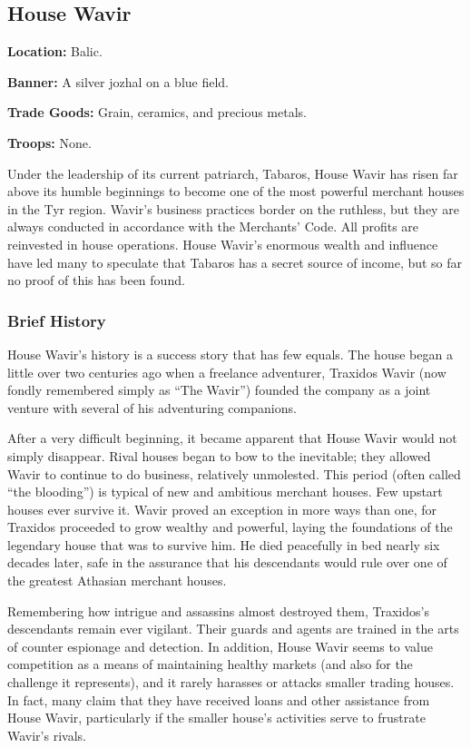 \subsection{House Wavir}
\textbf{Location:} Balic.

\textbf{Banner:} A silver jozhal on a blue field.

\textbf{Trade Goods:} Grain, ceramics, and precious metals.

\textbf{Troops:} None.

Under the leadership of its current patriarch, Tabaros, House Wavir has risen far above its humble beginnings to become one of the most powerful merchant houses in the Tyr region. Wavir's business practices border on the ruthless, but they are always conducted in accordance with the Merchants' Code. All profits are reinvested in house operations. House Wavir's enormous wealth and influence have led many to speculate that Tabaros has a secret source of income, but so far no proof of this has been found.

\subsubsection{Brief History}
House Wavir's history is a success story that has few equals. The house began a little over two centuries ago when a freelance adventurer, Traxidos Wavir (now fondly remembered simply as ``The Wavir'') founded the company as a joint venture with several of his adventuring companions.

After a very difficult beginning, it became apparent that House Wavir would not simply disappear. Rival houses began to bow to the inevitable; they allowed Wavir to continue to do business, relatively unmolested. This period (often called ``the blooding'') is typical of new and ambitious merchant houses. Few upstart houses ever survive it. Wavir proved an exception in more ways than one, for Traxidos proceeded to grow wealthy and powerful, laying the foundations of the legendary house that was to survive him. He died peacefully in bed nearly six decades later, safe in the assurance that his descendants would rule over one of the greatest Athasian merchant houses.

Remembering how intrigue and assassins almost destroyed them, Traxidos's descendants remain ever vigilant. Their guards and agents are trained in the arts of counter espionage and detection. In addition, House Wavir seems to value competition as a means of maintaining healthy markets (and also for the challenge it represents), and it rarely harasses or attacks smaller trading houses. In fact, many claim that they have received loans and other assistance from House Wavir, particularly if the smaller house's activities serve to frustrate Wavir's rivals.

